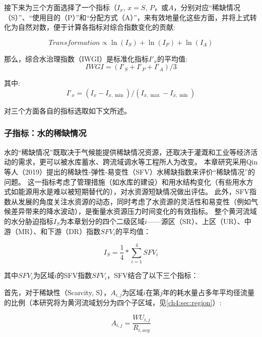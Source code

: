 接下来为三个方面选择了一个指标（$I_x$, $x=S$, $P$，或$A$，分别对应“稀缺情况（S）”、“使用目的（P）”和“分配方式（A）”，来有效地量化这些方面，并将上式转化为自然对数，便于计算各指标对综合指数变化的贡献:

\begin{equation}
    Transformation \propto \ln(I_S) + \ln(I_P) + \ln(I_A)
\end{equation}

那么，综合水治理指数（IWGI）是标准化指标$I'_x$的平均值:
\begin{equation}
    IWGI = (I'_S + I'_P + I'_A) / 3
    \label{ch4:eq:IWGI}
\end{equation}

其中:
\begin{equation}
    I'_x = (I_x - I_{x, \min}) / (I_{x, \max} - I_{x, \min})
\end{equation}

对三个方面各自的指标选取如下文所述。

\subsubsection{子指标：水的稀缺情况}

水的“稀缺情况”既取决于气候能提供稀缺情况资源，还取决于灌溉和工业等经济活动的需求，更可以被水库蓄水、跨流域调水等工程所人为改变\cite{qin2019,wada2014,huang2021}。
本章研究采用Qin等人（2019）提出的稀缺性-弹性-易变性（SFV）水稀缺指数来评价“稀缺情况”的问题\cite{qin2019}。
这一指标考虑了管理措施（如水库的建设）和用水结构变化（有些用水方式如能源用水是难以被短期替代的），对水资源短缺情况做出评估。
此外，SFV指数从发展的角度关注水资源的动态，同时考虑了水资源的灵活性和易变性（例如气候差异带来的降水波动），是衡量水资源压力\cite{qin2019}时间变化的有效指标。
整个黄河流域的水分胁迫指标$I_S$为本章划分的四个二级区域$i$——源区（SR）、上区（UR）、中游（MR）、和下游（DR）指数$SFV_{i}$的平均值：

\begin{equation}
    I_S = \frac{1}{4} * \sum_{i=1}^4 SFV_{i}
    \label{ch4:eq:scarcity}
\end{equation}

其中$SFV_i$为区域$i$的SFV指数$SFV_i$，SFV结合了以下三个指标：

首先，对于稀缺性（Scarcity, S），$A_{i, j}$为区域$i$在第$j$年的耗水量占多年平均径流量的比例（本研究将为黄河流域划分为四个子区域，见\ref{ch4:sec:region}）:

\begin{equation}
    A_{i, j} = \frac{WU_{i,j}}{R_{i, avg}}
\end{equation}

